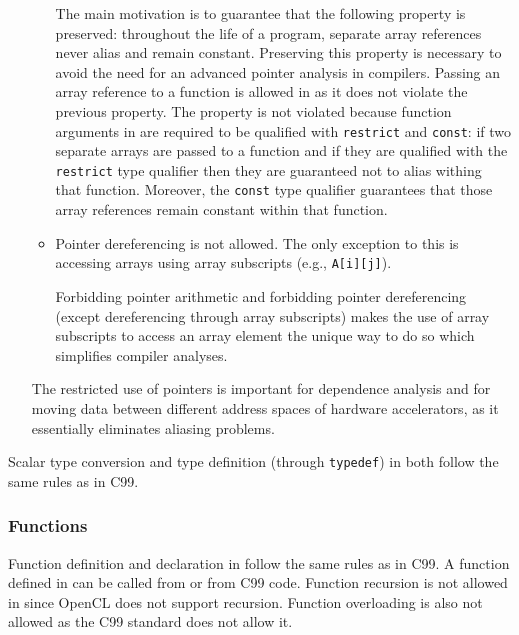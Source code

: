 \begin{itemize}
\begin{itemize}
      The main motivation is to guarantee that the following property is
      preserved:
      throughout the life of a \pencil program, separate array references
      never alias and remain constant.
      Preserving this property is necessary to avoid the need for an
      advanced pointer
      analysis in \pencil compilers.
      Passing an array reference to a function is allowed in \pencil as it does not violate the previous
      property.  The property is not violated because function arguments in \pencil are required to be
      qualified with \lstinline!restrict! and \lstinline!const!:
      if two separate arrays are passed to a function and if they
      are qualified with the
      \lstinline!restrict! type qualifier then they are guaranteed
      not to alias withing that function.
      Moreover, the \lstinline!const! type qualifier guarantees
      that those array references remain constant within that function.

    \item Pointer dereferencing is not allowed.  The only exception to
      this is accessing arrays using array subscripts
      (e.g., \lstinline!A[i][j]!).

      Forbidding pointer arithmetic and forbidding pointer dereferencing
      (except dereferencing through array subscripts) makes the use of
      array subscripts to access an array element the unique way to do so
      which simplifies compiler analyses.
  \end{itemize}
    The restricted use of pointers is important for dependence analysis and
    for moving data between
    different address spaces of hardware accelerators, as it essentially
    eliminates aliasing problems.
 \end{itemize}

Scalar type conversion and type definition (through \lstinline!typedef!) in \pencil
both follow the same rules as in C99.

\subsubsection{Functions}
Function definition and declaration in \pencil follow the same
rules as in C99.
A function defined in \pencil can be called from \pencil
or from C99 code.
Function recursion is not allowed in \pencil since OpenCL does
not support recursion.
Function overloading is also not allowed as the C99 standard
does not allow it.


